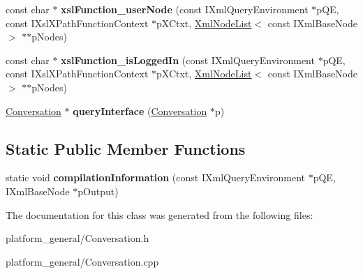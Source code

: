 \begin{DoxyCompactItemize}
\item 
\hypertarget{group__XSLModule-Functions_gab49d1847468e3d2bdc0f79161e151824}{const char $\ast$ {\bfseries xsl\-Function\-\_\-user\-Node} (const \-I\-Xml\-Query\-Environment $\ast$p\-Q\-E, const \-I\-Xsl\-X\-Path\-Function\-Context $\ast$p\-X\-Ctxt, \hyperlink{classgeneral__server_1_1XmlNodeList}{\-Xml\-Node\-List}$<$ const \-I\-Xml\-Base\-Node $>$ $\ast$$\ast$p\-Nodes)}\label{group__XSLModule-Functions_gab49d1847468e3d2bdc0f79161e151824}

\item 
\hypertarget{group__XSLModule-Functions_ga1d931c167cd6a70deb467e7674a15628}{const char $\ast$ {\bfseries xsl\-Function\-\_\-is\-Logged\-In} (const \-I\-Xml\-Query\-Environment $\ast$p\-Q\-E, const \-I\-Xsl\-X\-Path\-Function\-Context $\ast$p\-X\-Ctxt, \hyperlink{classgeneral__server_1_1XmlNodeList}{\-Xml\-Node\-List}$<$ const \-I\-Xml\-Base\-Node $>$ $\ast$$\ast$p\-Nodes)}\label{group__XSLModule-Functions_ga1d931c167cd6a70deb467e7674a15628}

\item 
\hypertarget{classgeneral__server_1_1Conversation_a5e3d9dd7e46e99d26bd60e668ce77362}{\hyperlink{classgeneral__server_1_1Conversation}{\-Conversation} $\ast$ {\bfseries query\-Interface} (\hyperlink{classgeneral__server_1_1Conversation}{\-Conversation} $\ast$p)}\label{classgeneral__server_1_1Conversation_a5e3d9dd7e46e99d26bd60e668ce77362}

\end{DoxyCompactItemize}
\subsection*{\-Static \-Public \-Member \-Functions}
\begin{DoxyCompactItemize}
\item 
\hypertarget{classgeneral__server_1_1Conversation_a8153f3cc7b10d02fca91f99d3e660657}{static void {\bfseries compilation\-Information} (const \-I\-Xml\-Query\-Environment $\ast$p\-Q\-E, \-I\-Xml\-Base\-Node $\ast$p\-Output)}\label{classgeneral__server_1_1Conversation_a8153f3cc7b10d02fca91f99d3e660657}

\end{DoxyCompactItemize}


\-The documentation for this class was generated from the following files\-:\begin{DoxyCompactItemize}
\item 
platform\-\_\-general/\-Conversation.\-h\item 
platform\-\_\-general/\-Conversation.\-cpp\end{DoxyCompactItemize}
